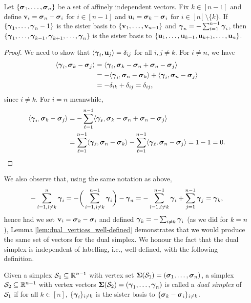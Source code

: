 \begin{lemma}
	\label{lem:dual_vertices_well-defined}
	Let $\{\vb*{\sigma}_1,\dots,\vb*{\sigma}_n\}$ be a set of affinely independent vectors. Fix $k\in [n-1]$ and define $\vb{v}_i=\vb*{\sigma}_n-\vb*{\sigma}_i$ for $i\in[n-1]$ and $\vb{u}_i=\vb*{\sigma}_k-\vb*{\sigma}_i$  for $i\in[n]\setminus\{k\}$. If $\{\vb*{\gamma}_1,\dots,\vb*{\gamma}_n-1\}$ is the sister basis to $\{\vb{v}_1,\dots,\vb{v}_{n-1}\}$ and $\vb*{\gamma}_n = -\sum_{i=1}^{n-1}\vb*{\gamma}_i$, then $\{\vb*{\gamma}_1,\dots,\vb*{\gamma}_{k-1},\vb*{\gamma}_{k+1},\dots,\vb*{\gamma}_{n}\}$ is the sister basis to $\{\vb{u}_1,\dots,\vb{u}_{k-1},\vb{u}_{k+1},\dots,\vb{u}_n\}$. 
\end{lemma}
\begin{proof}
	We need to show that $\langle \vb*{\gamma}_i,\vb{u}_j\rangle = \delta_{ij}$ for all $i,j\neq k$. For $i\neq n$, we have 
	\begin{align*}
	\langle \vb*{\gamma}_i, \vb*{\sigma}_k-\vb*{\sigma}_j\rangle &= \langle \vb*{\gamma}_i,\vb*{\sigma}_k-\vb*{\sigma}_n+\vb*{\sigma}_n-\vb*{\sigma}_j\rangle \\
	&= -\langle \vb*{\gamma}_i,\vb*{\sigma}_n-\vb*{\sigma}_k \rangle + \langle \vb*{\gamma}_i,\vb*{\sigma}_n-\vb*{\sigma}_j\rangle \\
	&= -\delta_{ik} + \delta_{ij} = \delta_{ij},
	\end{align*}
	since $i\neq k$. For $i=n$ meanwhile, 
	\begin{align*}
	\langle \vb*{\gamma}_i,\vb*{\sigma}_k-\vb*{\sigma}_j\rangle &= -\sum_{\ell=1}^{n-1}\langle \vb*{\gamma}_\ell,\vb*{\sigma}_k-\vb*{\sigma}_n+\vb*{\sigma}_n-\vb*{\sigma}_j\rangle \\
	&= \sum_{\ell=1}^{n-1}\langle \vb*{\gamma}_\ell,\vb*{\sigma}_n-\vb*{\sigma}_k\rangle - \sum_{\ell=1}^{n-1}\langle  \vb*{\gamma}_\ell,\vb*{\sigma}_n-\vb*{\sigma}_j\rangle =1-1=0. \qedhere
	\end{align*}
\end{proof}

We also observe that, using the same notation as above, 
\[-\sum_{i=1,i\neq k}^n \vb*{\gamma}_i = -\bigg(\sum_{i=1,i\neq k}^{n-1} \vb*{\gamma}_i\bigg) - \vb*{\gamma}_n = -\sum_{i=1,i\neq k}^{n-1}\vb*{\gamma}_i + \sum_{j=1}^{n-1} \vb*{\gamma}_j = \vb*{\gamma}_k,\]
hence had we set $\vb{v}_i=\vb*{\sigma}_k-\vb*{\sigma}_i$ and defined $\vb*{\gamma}_k = -\sum_{i\neq k}\vb*{\gamma}_i$ (as we did for $k=n$), Lemma \ref{lem:dual_vertices_well-defined} demonstrates that we would produce the same set of vectors for the dual simplex. We honour the fact that the dual simplex is independent of labelling, i.e., well-defined, with the following definition. 

\begin{definition}
\label{def:dual_simplex}
Given a simplex $\mathcal{S}_1\subseteq\mathbb{R}^{n-1}$ with vertex set $\boldsymbol{\Sigma}(\mathcal{S}_1)=(\vb*{\sigma}_1,\dots,\vb*{\sigma}_n)$, a simplex $\mathcal{S}_2\subseteq \mathbb{R}^{n-1}$ with vertex vectors $\boldsymbol{\Sigma}(\mathcal{S}_2)=(\vb*{\gamma}_1,\dots,\vb*{\gamma}_n)$ is called a \emph{dual simplex} of $\mathcal{S}_1$ if for all $k\in[n]$, $\{\vb*{\gamma}_i\}_{i\neq k}$ is the sister basis to $\{\vb*{\sigma}_k-\vb*{\sigma}_i\}_{i\neq k}$. 
\end{definition}

